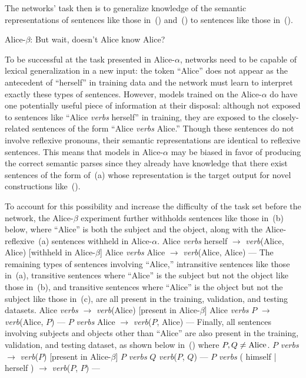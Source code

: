 The networks' task then is to generalize knowledge of the semantic 
representations of sentences like those in~(\blastx) and~(\lastx) to sentences
like those in~().

\ssec Alice-$\beta$: But wait, doesn't Alice know Alice?

To be successful at the task presented in Alice-$\alpha$, networks need to be
capable of lexical generalization in a new input: the token ``Alice'' does not
appear as the antecedent of ``herself'' in training data and the network must
learn to interpret exactly these types of sentences. However, models trained
on the Alice-$\alpha$ do have one potentially useful piece of information at
their disposal: although not exposed to sentences like ``Alice {\em verbs} 
herself'' in training, they are exposed to the closely-related sentences of
the form ``Alice {\em verbs} Alice.'' Though these sentences do not involve
reflexive pronouns, their semantic representations are identical to reflexive
sentences. This means that models in Alice-$\alpha$ may be biased in favor of
producing the correct semantic parses since they already have knowledge that
there exist sentences of the form of~(a) whose
representation is the target output for novel constructions like~().

To account for this possibility and increase the difficulty of the task set 
before the network, the Alice-$\beta$ experiment further withholds sentences
like those in~(\nextx b) below, where ``Alice'' is both the subject and the
object, along with the Alice-reflexive~(\nextx a) sentences withheld in 
Alice-$\alpha$.
	\a Alice {\em verbs} herself $\to$ {\em verb}(Alice, Alice) \hfill [withheld in Alice-$\beta$]
	\a Alice {\em verbs} Alice $\to$ {\em verb}(Alice, Alice) \hfill  ---
\xe
The remaining types of sentences involving ``Alice,'' intransitive sentences 
like those in~(\nextx a), transitive sentences where ``Alice'' is the subject
but not the object like those in~(\nextx b), and transitive sentences where 
``Alice'' is the object but not the subject like those in~(\nextx c), are all
present in the training, validation, and testing datasets.
\pex
	\a Alice {\em verbs} $\to$ {\em verb}(Alice) \hfill [present in Alice-$\beta$]
	\a Alice {\em verbs} $P$ $\to$ {\em verb}(Alice, $P$) \hfill ---
	\a $P$ {\em verbs} Alice $\to$ {\em verb}($P$, Alice) \hfill ---
\xe
Finally, all sentences involving subjects and objects other than ``Alice'' are 
also present in the training, validation, and testing dataset, as shown below
in~(\nextx) where $P,Q \not= \hbox{Alice}$.
\pex
	\a $P$ {\em verbs} $\to$ {\em verb}($P$) \hfill [present in Alice-$\beta$]
	\a $P$ {\em verbs} $Q$ {\em verb}($P$, $Q$) \hfill ---
	\a $P$ {\em verbs} ( himself | herself ) $\to$ {\em verb}($P$, $P$) \hfill ---
\xe

